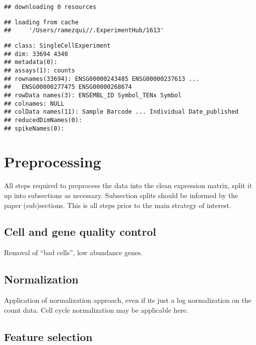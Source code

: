\documentclass[]{book}
\begin{document}
\begin{verbatim}
## downloading 0 resources
\end{verbatim}

\begin{verbatim}
## loading from cache 
##     '/Users/ramezqui//.ExperimentHub/1613'
\end{verbatim}

\begin{verbatim}
## class: SingleCellExperiment 
## dim: 33694 4340 
## metadata(0):
## assays(1): counts
## rownames(33694): ENSG00000243485 ENSG00000237613 ...
##   ENSG00000277475 ENSG00000268674
## rowData names(3): ENSEMBL_ID Symbol_TENx Symbol
## colnames: NULL
## colData names(11): Sample Barcode ... Individual Date_published
## reducedDimNames(0):
## spikeNames(0):
\end{verbatim}

\hypertarget{preprocessing}{%
\section{Preprocessing}\label{preprocessing}}

All steps required to preprocess the data into the clean expression matrix, split it up into subsections as necessary. Subsection splits should be informed by the paper (sub)sections. This is all steps prior to the main strategy of interest.

\hypertarget{cell-and-gene-quality-control}{%
\subsection{Cell and gene quality control}\label{cell-and-gene-quality-control}}

Removal of ``bad cells'', low abundance genes.

\hypertarget{normalization}{%
\subsection{Normalization}\label{normalization}}

Application of normalization approach, even if its just a log normalization on the count data. Cell cycle normalization may be applicable here.

\hypertarget{feature-selection}{%
\subsection{Feature selection}\label{feature-selection}}
\end{document}
